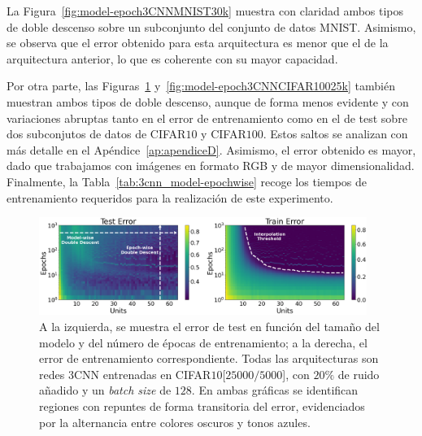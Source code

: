 La Figura~\ref{fig:model-epoch3CNNMNIST30k} muestra con claridad ambos tipos de doble descenso sobre un subconjunto del conjunto de datos MNIST. Asimismo, se observa que el error obtenido para esta arquitectura es menor que el de la arquitectura anterior, lo que es coherente con su mayor capacidad.

Por otra parte, las Figuras~\ref{fig:model-epoch3CNNCIFAR10} y~\ref{fig:model-epoch3CNNCIFAR10025k} también muestran ambos tipos de doble descenso, aunque de forma menos evidente y con variaciones abruptas tanto en el error de entrenamiento como en el de test sobre dos subconjutos de datos de CIFAR$10$ y CIFAR$100$. Estos saltos se analizan con más detalle en el Apéndice~\ref{ap:apendiceD}. Asimismo, el error obtenido es mayor, dado que trabajamos con imágenes en formato RGB y de mayor dimensionalidad. Finalmente, la Tabla~\ref{tab:3cnn_model-epochwise} recoge los tiempos de entrenamiento requeridos para la realización de este experimento.

\begin{figure}[h]
    \centering
    \includegraphics[width=0.95\textwidth]{img/experiments/model-epoch3CNNCIFAR1025k.png}
    \caption[Doble descenso en función del tamaño del modelo y del número de épocas para la red $3$CNN y un subconjunto de CIFAR$10$.]{A la izquierda, se muestra el error de test en función del tamaño del modelo y del número de épocas de entrenamiento; a la derecha, el error de entrenamiento correspondiente. Todas las arquitecturas son redes $3$CNN entrenadas en CIFAR$10$[$25000/5000$], con $20\%$ de ruido añadido y un \textit{batch size} de $128$. En ambas gráficas se identifican regiones con repuntes de forma transitoria del error, evidenciados por la alternancia entre colores oscuros y tonos azules.}\label{fig:model-epoch3CNNCIFAR10}
\end{figure}

